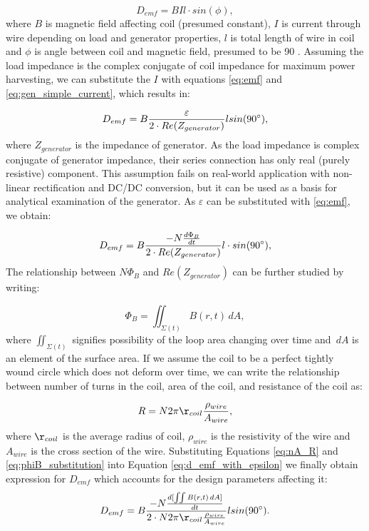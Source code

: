 \begin{equation}\label{eq:d_emd}
  D_{emf} = BIl \cdot sin(\phi),
\end{equation}
where $B$ is magnetic field affecting coil (presumed constant), $I$ is current through wire depending on load and generator properties, $l$ is total length of wire in coil and $\phi$ is angle between coil and magnetic field, presumed to be 90 \degree. Assuming the load impedance is the complex conjugate of coil impedance for maximum power harvesting, we can substitute the $I$ with equations \eqref{eq:emf} and \eqref{eq:gen_simple_current}, which results in: 

\begin{equation}
  D_{emf} = B \frac{\varepsilon}{2 \cdot Re(Z_{generator})} l sin(90 \degree),
\end{equation}
where $Z_{generator}$ is the impedance of generator. As the load impedance is complex conjugate of generator impedance, their series connection has only real (purely resistive) component. This assumption fails on real-world application with non-linear rectification and DC/DC conversion, but it can be used as a basis for analytical examination of the generator. As $\varepsilon$ can be substituted with \eqref{eq:emf}, we obtain:

\begin{equation}\label{eq:d_emf_with_epsilon}
  D_{emf} = B \frac{-N \frac{d \Phi_{B}}{d t}}{2 \cdot Re(Z_{generator})} l \cdot sin(90 \degree),
\end{equation}
The relationship between $N \Phi_{B}$ and $Re(Z_{generator})$ can be further studied by writing: 

\begin{equation}\label{eq:phiB_substitution}
  \Phi_{B} = \iint_{\Sigma (t)} B(r, t) \,dA,
\end{equation}
where $ \iint_{\Sigma (t)} $ signifies possibility of the loop area changing over time and $\,dA$ is an element of the surface area. If we assume the coil to be a perfect tightly wound circle which does not deform over time, we can write the relationship between number of turns in the coil, area of the coil, and resistance of the coil as:

\begin{equation}\label{eq:nA_R}
  R = N 2\pi \r_{coil} \frac{\rho_{wire}}{A_{wire}},
\end{equation}
where $\r_{coil}$ is the average radius of coil, $\rho_{wire}$ is the resistivity of the wire and $A_{wire}$ is the cross section of the wire. Substituting Equations \eqref{eq:nA_R} and \eqref{eq:phiB_substitution} into Equation \eqref{eq:d_emf_with_epsilon} we finally obtain expression for $D_{emf}$ which accounts for the design parameters affecting it:
\begin{equation}\label{eq:d_emf_complete}
  D_{emf} = B \frac{-N \frac{d [\iint B(r, t) \,dA]}{d t}}{2 \cdot N 2\pi \r_{coil} \frac{\rho_{wire}}{A_{wire}}} l sin(90 \degree).
\end{equation}

